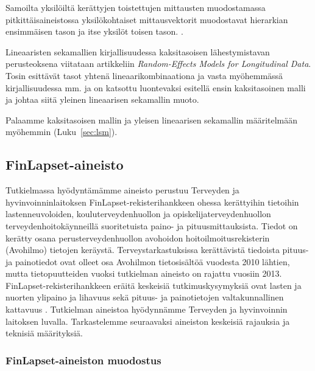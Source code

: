 \documentclass[finnish]{docopts}
\begin{document}
Samoilta yksilöiltä kerättyjen toistettujen mittausten muodostamassa pitkittäisaineistossa yksilökohtaiset mittausvektorit muodostavat hierarkian ensimmäisen tason ja itse yksilöt toisen tason. \citep{goldstein11}.

Lineaaristen sekamallien kirjallisuudessa kaksitasoisen lähestymistavan perusteoksena viitataan \cite{laird82} artikkeliin \textit{Random-Effects Models for Longitudinal Data}. Tosin \cite{laird82} esittävät tasot yhtenä lineaarikombinaationa ja vasta myöhemmässä kirjallisuudessa mm. \cite{verbeke00} ja \cite{talbott06} on katsottu luontevaksi esitellä ensin kaksitasoinen malli ja johtaa siitä \cite{laird82} yleinen lineaarisen sekamallin muoto.

Palaamme kaksitasoisen mallin ja yleisen lineaarisen sekamallin määritelmään myöhemmin (Luku~\ref{sec:lsm}).\\

\subsection{FinLapset-aineisto}
\label{sub:finlapsetdata}

Tutkielmassa hyödyntämämme aineisto perustuu Terveyden ja hyvinvoinninlaitoksen FinLapset-rekisterihankkeen \citep{finlapsetrekisteri} ohessa kerättyihin tietoihin lastenneuvoloiden, kouluterveydenhuollon ja opiskelijaterveydenhuollon terveydenhoitokäynneillä suoritetuista paino- ja pituusmittauksista. Tiedot on kerätty osana perusterveydenhuollon avohoidon hoitoilmoitusrekisterin (Avohilmo) tietojen keräystä. Terveystarkastuksissa kerättävistä tiedoista pituus- ja painotiedot ovat olleet osa Avohilmon tietosisältöä vuodesta 2010 lähtien, mutta tietopuutteiden vuoksi tutkielman aineisto on rajattu vuosiin 2013.\\

FinLapset-rekisterihankkeen eräitä keskeisiä tutkimuskysymyksiä ovat lasten ja nuorten ylipaino ja lihavuus sekä pituus- ja painotietojen valtakunnallinen kattavuus \citep{finlapsetrekisteri}. Tutkielman aineistoa hyödynnämme Terveyden ja hyvinvoinnin laitoksen luvalla. Tarkastelemme seuraavaksi aineiston keskeisiä rajauksia ja teknisiä määrityksiä. \\

\subsubsection{FinLapset-aineiston muodostus}
\label{ssb:finlapsetdatamuod}
\end{document}
